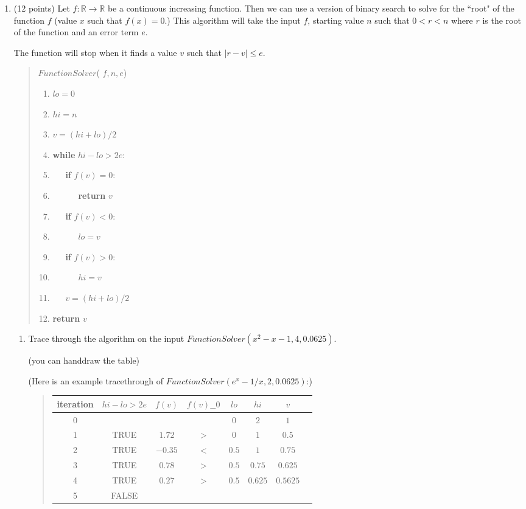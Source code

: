 \documentclass[10pt,letterpaper,unboxed,cm]{article}
\theoremstyle{definition}
\begin{document}
\begin{enumerate}



\item (12 points)
Let $f:\mathbb{R}\to \mathbb{R}$ be a continuous increasing function. Then we can use a version of binary search to solve for the ``root" of the function $f$ (value $x$ such that $f(x)=0$.) This algorithm will take the input $f$, starting value $n$ such that $0< r< n$ where $r$ is the root of the function and an error term $e$.

The function will stop when it finds a value $v$ such that $|r-v|\leq e$.



\begin{quote}
\noindent $FunctionSolver$( $f,n,e$)
\begin{enumerate}[1.]
\item $lo = 0$
\item $hi = n$
\item $v=(hi+lo)/2$
\item {\bf while} $hi-lo> 2e$:
\item ~~~{\bf if} $f(v)=0$:
\item ~~~~~~{\bf return} $v$
\item ~~~{\bf if} $f(v)<0$:
\item ~~~~~~$lo = v$
\item ~~~{\bf if} $f(v)>0$:
\item ~~~~~~$hi = v$
\item ~~~$v=(hi+lo)/2$
\item {\bf return} $v$
\end{enumerate}
\end{quote}


\begin{enumerate}

\item
Trace through the algorithm on the input $FunctionSolver(x^2-x-1,4,0.0625)$.

(you can handdraw the table)

(Here is an example tracethrough of $FunctionSolver(e^x-1/x,2,0.0625)$:)

\begin{quote}

\begin{tabular}{|c|c|c|c|c|c|c|c|}
iteration&$hi-lo>2e$&$f(v)$&$f(v)\_\_0$&$lo$&$hi$&$v$\\
\hline
0&&&&$0$&$2$&$1$\\
\hline
1&TRUE&$1.72$&$>$&$0$&$1$&$0.5$\\
\hline
2&TRUE&$-0.35$&$<$&$0.5$&$1$&$0.75$\\
\hline
3&TRUE&$0.78$&$>$&$0.5$&$0.75$&$0.625$\\
\hline
4&TRUE&$0.27$&$>$&$0.5$&$0.625$&$0.5625$\\
\hline
5&FALSE&&&&&\\
\end{tabular}


\end{quote}
\end{enumerate}
\end{enumerate}
\end{document}
